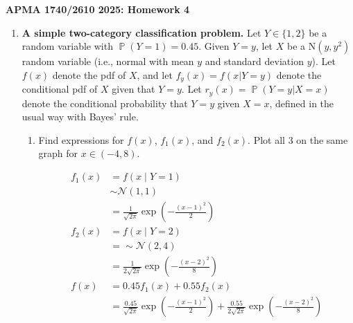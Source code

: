 \documentclass[11pt]{report}
\DeclareMathOperator{\Prob}{\mathbb{P}}
\begin{document}
\begin{center}
	{\bf\large APMA 1740/2610 2025: Homework 4}
\end{center}
\medskip


\begin{enumerate}[1.]


	\item {\bf A simple two-category classification problem.}
	      Let $Y\in\{1,2\}$ be a random variable with $\Prob(Y=1)=0.45$. Given $Y=y$, let $X$ be a N$(y,y^2)$ random variable (i.e., normal with mean $y$ and standard deviation $y$). Let $f(x)$ denote the pdf of $X$, and let $f_y(x)=f(x|Y=y)$ denote the conditional pdf of $X$ given that $Y=y$. Let $r_y(x)=\Prob(Y=y|X=x)$ denote the conditional probability that $Y=y$ given $X=x$, defined in the usual way with Bayes' rule.
	      \begin{enumerate}
		      \item Find expressions for $f(x)$, $f_1(x)$, and $f_2(x)$. Plot all 3 on the same graph for $x\in(-4,8)$.

		            \color{blue}
		            \begin{align*}
			            f_1(x) & = f(x \; | \; Y = 1)                                                                                                               \\
			                   & \sim \mathcal N(1, 1)                                                                                                              \\
			                   & = \frac{1}{\sqrt{2\pi}} \exp\left(-\frac{(x - 1)^2}{2}\right)                                                                      \\
			            f_2(x) & = f(x \; | \; Y = 2)                                                                                                               \\
			                   & = \sim \mathcal N(2, 4)                                                                                                            \\
			                   & = \frac{1}{2\sqrt{2\pi}} \exp\left(-\frac{(x - 2)^2}{8}\right)                                                                     \\
			            f(x)   & = 0.45 f_1(x) + 0.55 f_2(x)                                                                                                        \\
			                   & = \frac{0.45}{\sqrt{2\pi}} \exp\left(-\frac{(x - 1)^2}{2}\right) + \frac{0.55}{2\sqrt{2\pi}} \exp\left(-\frac{(x - 2)^2}{8}\right)
		            \end{align*}


\end{enumerate}
\end{enumerate}
\end{document}
